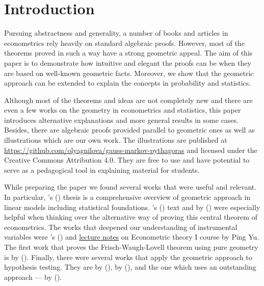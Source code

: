 \section{Introduction}

\begin{fullwidth}

Pursuing abstractness and generality, a number of books and articles in
econometrics rely heavily on standard algebraic proofs.
However, most of the theorems proved in such a way have a strong geometric appeal.
The aim of this paper is to demonstrate how intuitive and elegant the proofs
can be when they are based on well-known geometric facts.
Moreover, we show that the geometric approach can be extended to explain
the concepts in probability and statistics.

Although most of the theorems and ideas are not completely new and
there are even a few works on the geometry in econometrics and statistics,
this paper introduces alternative explanations and more general results in some cases.
Besides, there are algebraic proofs provided parallel to geometric ones
as well as illustrations which are our own work. 
The illustrations are published at \url{https://github.com/olyagnilova/gauss-markov-pythagoras} and licensed under the
Creative Commons Attribution 4.0. %
They are free to use and have potential to serve as a pedagogical tool
in explaining material for students.

While preparing the paper we found several works that were useful and relevant.
In particular, \citeauthor{jacobson}'s (\citeyear{jacobson}) thesis 
is a comprehensive overview of geometric approach in linear models including
statistical foundations.
\citeauthor{gmt_blue}’s (\citeyear{gmt_blue}) text  and
 by
\citeauthor{gmt_american_statistician} (\citeyear{gmt_american_statistician}) were especially helpful when thinking over
the alternative way of proving this central theorem of econometrics.
The works that deepened our understanding of instrumental variables were
\citeauthor{Butler2016}'s (\citeyear{Butler2016}) 
and \href{http://web.hku.hk/~pingyu/6005/6005.htm}{lecture notes} on Econometric theory I course by Ping Yu.
The first work that proves the Frisch-Waugh-Lovell theorem using pure geometry
is  by
\citeauthor{fwl} (\citeyear{fwl}).
Finally, there were several works that apply the geometric approach to
hypothesis testing. They are
by \citeauthor{Langsrud2004} (\citeyear{Langsrud2004}),
by \citeauthor{Siniksaran2005} (\citeyear{Siniksaran2005}),
and the one which uses an outstanding approach —
by \citeauthor{friendly2013} (\citeyear{friendly2013}).


\end{fullwidth}

